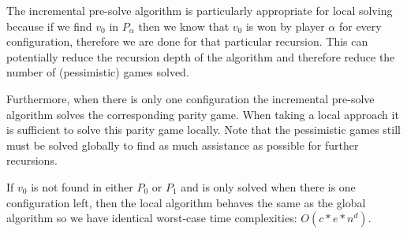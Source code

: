 The incremental pre-solve algorithm is particularly appropriate for local solving because if we find ${v}_0$ in  $P_\alpha$ then we know that ${v}_0$ is won by player $\alpha$ for every configuration, therefore we are done for that particular recursion. This can potentially reduce the recursion depth of the algorithm and therefore reduce the number of (pessimistic) games solved.

Furthermore, when there is only one configuration the incremental pre-solve algorithm solves the corresponding parity game. When taking a local approach it is sufficient to solve this parity game locally. Note that the pessimistic games still must be solved globally to find as much assistance as possible for further recursions.

If $v_0$ is not found in either $P_0$ or $P_1$ and is only solved when there is one configuration left, then the local algorithm behaves the same as the global algorithm so we have identical worst-case time complexities: $O(c*e*n^d)$.